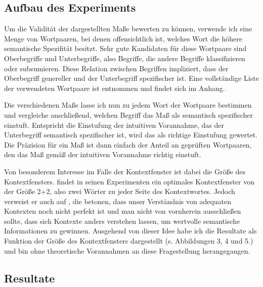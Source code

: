 \documentclass[11pt,numbers=noenddot]{scrartcl}
\begin{document}
\subsection{Aufbau des Experiments} \label{aufbau}

Um die Validität der dargestellten Maße bewerten zu können, verwende ich eine Menge von Wortpaaren, bei denen offensichtlich ist, welches Wort die höhere semantische Spezifität besitzt. Sehr gute Kandidaten für diese Wortpaare sind Oberbegriffe und Unterbegriffe, also Begriffe, die andere Begriffe klassifizieren oder subsumieren. Diese Relation zwischen Begriffen impliziert, dass der Oberbegriff genereller und der Unterbegriff spezifischer ist. Eine vollständige Liste der verwendeten Wortpaare ist \citet{Caraballo99determiningthe} entnommen und findet sich im Anhang.

Die verschiedenen Maße lasse ich nun zu jedem Wort der Wortpaare bestimmen und vergleiche anschließend, welchen Begriff das Maß als semantisch spezifischer einstuft. Entspricht die Einstufung der intuitiven Vorannahme, das der Unterbegriff semantisch spezifischer ist, wird das als richtige Einstufung gewertet. Die Präzision für ein Maß ist dann einfach der Anteil an geprüften Wortpaaren, den das Maß gemäß der intuitiven Vorannahme richtig einstuft.

Von besonderem Interesse im Falle der Kontextfenster ist dabei die Größe des Kontextfensters. \citet[S. 68]{sahlgren2006word} findet in seinen Experimenten ein optimales Kontextfenster von der Größe 2+2, also zwei Wörter zu jeder Seite des Kontextwortes. Jedoch verweist er auch auf \citet{Miller2000-MILLRF}, die betonen, dass unser Verständnis von adequaten Kontexten noch nicht perfekt ist und man nicht von vornherein ausschließen sollte, dass sich Kontexte anders verstehen lassen, um wertvolle semantische Informationen zu gewinnen. Ausgehend von dieser Idee habe ich die Resultate als Funktion der Größe des Kontextfensters dargestellt (s. Abbildungen 3, 4 und 5.) und bin ohne theoretische Vorannahmen an diese Fragestellung herangegangen.

\subsection{Resultate}
\end{document}
